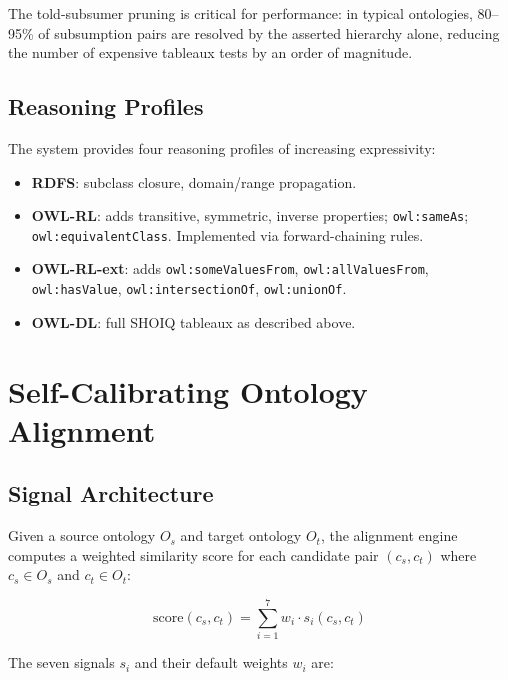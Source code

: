 \documentclass[runningheads]{llncs}
\begin{document}
The told-subsumer pruning is critical for performance: in typical ontologies, 80--95\% of subsumption pairs are resolved by the asserted hierarchy alone, reducing the number of expensive tableaux tests by an order of magnitude.

\subsection{Reasoning Profiles}

The system provides four reasoning profiles of increasing expressivity:

\begin{itemize}
    \item \textbf{RDFS}: subclass closure, domain/range propagation.
    \item \textbf{OWL-RL}: adds transitive, symmetric, inverse properties; \texttt{owl:sameAs}; \texttt{owl:equivalentClass}. Implemented via forward-chaining rules.
    \item \textbf{OWL-RL-ext}: adds \texttt{owl:someValuesFrom}, \texttt{owl:allValuesFrom}, \texttt{owl:hasValue}, \texttt{owl:intersectionOf}, \texttt{owl:unionOf}.
    \item \textbf{OWL-DL}: full SHOIQ tableaux as described above.
\end{itemize}


\section{Self-Calibrating Ontology Alignment}
\label{sec:alignment}

\subsection{Signal Architecture}

Given a source ontology $O_s$ and target ontology $O_t$, the alignment engine computes a weighted similarity score for each candidate pair $(c_s, c_t)$ where $c_s \in O_s$ and $c_t \in O_t$:

\begin{equation}
\text{score}(c_s, c_t) = \sum_{i=1}^{7} w_i \cdot s_i(c_s, c_t)
\label{eq:align}
\end{equation}

The seven signals $s_i$ and their default weights $w_i$ are:
\end{document}

